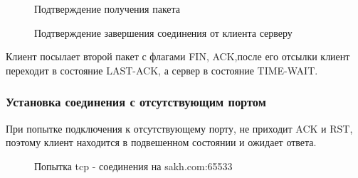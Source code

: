 \documentclass[a4paper, 14pt,russian]{article}
\begin{document}
	\begin{figure}[h!]
		\caption{Подтверждение получения пакета}
		\label{img:tcp_reset}
	\end{figure}
	\newpage

	\begin{figure}[h!]
		\caption{Подтверждение завершения соединения от клиента серверу}
		\label{img:tcp_reset}
	\end{figure}
	Клиент посылает второй пакет с флагами FIN, ACK,после его отсылки клиент переходит в состояние
	LAST-ACK, а сервер в состояние TIME-WAIT.


	\subsubsection{Установка соединения с отсутствующим портом}
		При попытке подключения к отсутствующему порту, не приходит ACK и RST, поэтому клиент находится в подвешенном состоянии и ожидает ответа.
		
		\begin{figure}[h!]
			\caption{Попытка tcp - соединения на sakh.com:65533}
			\label{img:tcp_reset}
		\end{figure}
\end{document}
